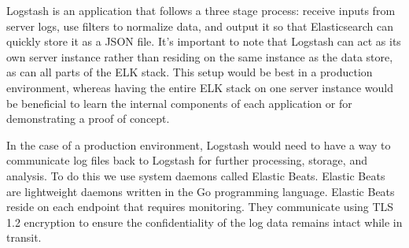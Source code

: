 \documentclass[./main.tex]{subfiles}
\begin{document}
Logstash is an application that follows a three stage process: receive inputs from server logs, use filters to normalize data, and output it so that Elasticsearch can quickly store it as a JSON file. It’s important to note that Logstash can act as its own server instance rather than residing on the same instance as the data store, as can all parts of the ELK stack. This setup would be best in a production environment, whereas having the entire ELK stack on one server instance would be beneficial to learn the internal components of each application or for demonstrating a proof of concept.

In the case of a production environment, Logstash would need to have a way to communicate log files back to Logstash for further processing, storage, and analysis. To do this we use system daemons called Elastic Beats. Elastic Beats are lightweight daemons written in the Go programming language. Elastic Beats reside on each endpoint that requires monitoring. They communicate using TLS 1.2 encryption to ensure the confidentiality of the log data remains intact while in transit.
\end{document}
